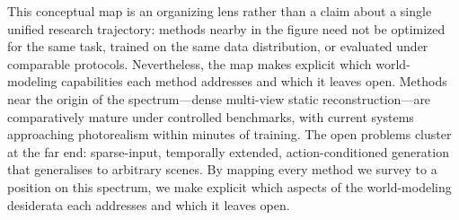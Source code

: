 This conceptual map is an organizing lens rather than a claim about a single unified research trajectory: methods nearby in the figure need not be optimized for the same task, trained on the same data distribution, or evaluated under comparable protocols. Nevertheless, the map makes explicit which world-modeling capabilities each method addresses and which it leaves open.
Methods near the origin of the spectrum---dense multi-view static reconstruction---are
comparatively mature under controlled benchmarks, with current systems approaching photorealism within minutes of
training.
The open problems cluster at the far end: sparse-input, temporally extended,
action-conditioned generation that generalises to arbitrary scenes.
By mapping every method we survey to a position on this spectrum, we make
explicit which aspects of the world-modeling desiderata each addresses and
which it leaves open.

